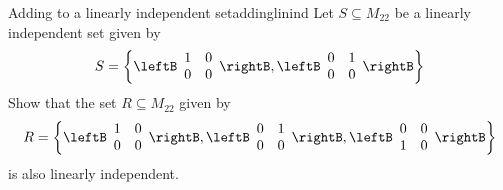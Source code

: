 \begin{example}{Adding to a linearly independent set}{addinglinind}
Let $S \subseteq M_{22}$ be a linearly independent set given by 
\[
S  = \left\{ \leftB \begin{array}{rr}
1 & 0 \\
0 & 0 
\end{array} \rightB, \leftB \begin{array}{rr}
0 & 1 \\
0 & 0 
\end{array} \rightB \right\}
\]
Show that the set $R \subseteq M_{22}$ given by 
\[
R = \left\{ \leftB \begin{array}{rr}
1 & 0 \\
0 & 0 
\end{array} \rightB, \leftB \begin{array}{rr}
0 & 1 \\
0 & 0 
\end{array} \rightB, \leftB \begin{array}{rr}
0 & 0 \\
1 & 0 
\end{array} \rightB \right\}
\]
is also linearly independent.
\end{example}

